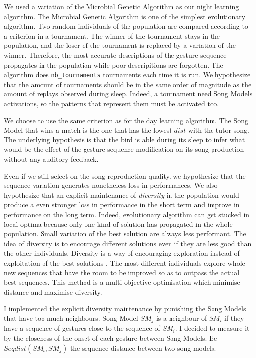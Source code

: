 \documentclass{report}
\begin{document}
We used a variation of the Microbial Genetic Algorithm as our night learning
algorithm. The Microbial Genetic Algorithm is one of the simplest evolutionary
algorithm. Two random individuals of the population are compared according to a
criterion in a tournament. The winner of the tournament stays in the population,
and the loser of the tournament is replaced by a variation of the winner.
Therefore, the most accurate descriptions of the gesture sequence propagates in
the population while poor descripitions are forgotten. The algorithm does
\texttt{nb\_tournaments} tournaments each time it is run. We hypothesize that
the amount of tournaments should be in the same order of magnitude as the amount
of replays observed during sleep. Indeed, a tournament need Song Models
activations, so the patterns that represent them must be activated too.

We choose to use the same criterion as for the day learning algorithm. The Song
Model that wins a match is the one that has the lowest \(dist\) with the tutor
song. The underlying hypothesis is that the bird is able during its sleep to
infer what would be the effect of the gesture sequence modification on its song
production without any auditory feedback.

Even if we still select on the song reproduction quality, we hypothesize that
the sequence variation generates nonetheless loss in performances. We also
hypothesize that an explicit maintenance of \emph{diversity} in the population
would produce a even stronger loss in performance in the short term and improve
in performance on the long term. Indeed, evolutionary algorithm can get stucked
in local optima because only one kind of solution has propagated in the whole
population. Small variation of the best solution are always less performant. The
idea of diversity is to encourage different solutions even if they are less good
than the other individuals. Diversity is a way of encouraging exploration
instead of exploitation of the best solutions
\parencite{eiben_introduction_2003}. The most different individuals explore
whole new sequences that have the room to be improved so as to outpass the
actual best sequences. This method is a multi-objective optimisation which
minimise distance and maximise diversity.

I implemented the explicit diversity maintenance by punishing the Song Models
that have too much neighbours. Song Model \(SM_j\) is a neighbour of \(SM_i\)
if they have a sequence of gestures close to the sequence of \(SM_i\). I decided
to measure it by the closeness of the onset of each gesture between Song Models.
Be \(Seqdist(SM_i, SM_j)\) the sequence distance between two song models.
\end{document}
